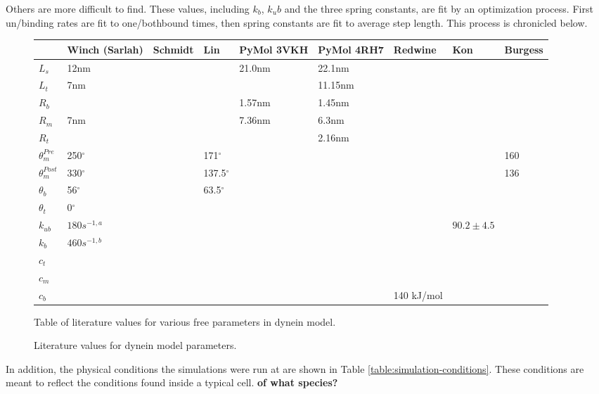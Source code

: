 \documentclass[10pt]{article} %
\begin{document}
Others are more difficult to find. These values, including $k_b$, $k_ub$ and the three spring constants, are fit by an optimization process. First un/binding rates are fit to one/bothbound times, then spring constants are fit to average step length. This process is chronicled below.

\begin{figure}[h]
  \centering
  \begin{tabular}{| l | l | l | l | l | l | l | l | l |}
    \hline
    & Winch (Sarlah) & Schmidt & Lin & PyMol 3VKH & PyMol 4RH7 & Redwine & Kon & Burgess \\\hline
    $L_s$ & 12nm & & & 21.0nm & 22.1nm & & & \\ \hline
    $L_t$ &  7nm & & & & 11.15nm & & & \\ \hline
    $R_b$ &  & & & 1.57nm & 1.45nm & & & \\ \hline
    $R_m$ &  7nm & & & 7.36nm & 6.3nm & & & \\ \hline
    $R_t$ &  & & & & 2.16nm & & & \\ \hline
    $\theta_{m}^{Pre}$ & 250$^{\circ}$ & & 171$^{\circ}$ & & & & & 160\\ \hline
    $\theta_{m}^{Post}$ & 330$^{\circ}$ & & 137.5$^{\circ}$ & & & & & 136\\ \hline
    $\theta_{b}$ & 56$^{\circ}$ & & 63.5$^{\circ}$ & & & & & \\ \hline
    $\theta_{t}$ & 0$^{\circ}$ & & & & & & & \\ \hline
    $k_{ub}$ & $180 s^{-1,a}$ & & & & & & $90.2 \pm 4.5$& \\ \hline
    $k_b$ & $460 s^{-1,b}$ & & & & & & & \\ \hline
    $c_t$ & & & & & & & & \\ \hline
    $c_m$ & & & & & & & & \\ \hline
    $c_b$ & & & & & & 140 kJ/mol & & \\ \hline
  \end{tabular}
  \caption{Literature values for dynein model parameters.}{Table of literature values for various free parameters in dynein model.}
  \label{table:parameter-table}
\end{figure}

In addition, the physical conditions the simulations were run at are shown in Table \ref{table:simulation-conditions}. These conditions are meant to reflect the conditions found inside a typical cell. \textbf{of what species?}\\
\end{document}

